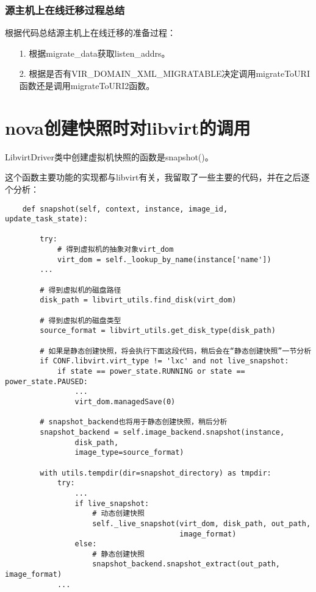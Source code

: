 \documentclass[a4paper,left=1.5cm,right=1.5cm,11pt]{article}
\begin{document}
\subsubsection{源主机上在线迁移过程总结}
	根据代码总结源主机上在线迁移的准备过程：
	\begin{itemize}
		\item[1.] 根据migrate\_data获取listen\_addrs。
		\item[2.] 根据是否有VIR\_DOMAIN\_XML\_MIGRATABLE决定调用migrateToURI函数还是调用migrateToURI2函数。
	\end{itemize}

\clearpage

\section{nova创建快照时对libvirt的调用}
	LibvirtDriver类中创建虚拟机快照的函数是snapshot()。\par

	这个函数主要功能的实现都与libvirt有关，我留取了一些主要的代码，并在之后逐个分析：
	\begin{lstlisting}
	def snapshot(self, context, instance, image_id, update_task_state):

        try:
			# 得到虚拟机的抽象对象virt_dom
            virt_dom = self._lookup_by_name(instance['name'])
        ...

		# 得到虚拟机的磁盘路径
        disk_path = libvirt_utils.find_disk(virt_dom)

		# 得到虚拟机的磁盘类型
        source_format = libvirt_utils.get_disk_type(disk_path)

		# 如果是静态创建快照，将会执行下面这段代码，稍后会在“静态创建快照”一节分析
		if CONF.libvirt.virt_type != 'lxc' and not live_snapshot:
            if state == power_state.RUNNING or state == power_state.PAUSED:
                ...
                virt_dom.managedSave(0)

		# snapshot_backend也将用于静态创建快照，稍后分析
        snapshot_backend = self.image_backend.snapshot(instance,
                disk_path,
                image_type=source_format)

        with utils.tempdir(dir=snapshot_directory) as tmpdir:
            try:
				...
                if live_snapshot:
					# 动态创建快照
                    self._live_snapshot(virt_dom, disk_path, out_path,
                                        image_format)
                else:
					# 静态创建快照
                    snapshot_backend.snapshot_extract(out_path, image_format)
            ...
	\end{lstlisting}
\end{document}
